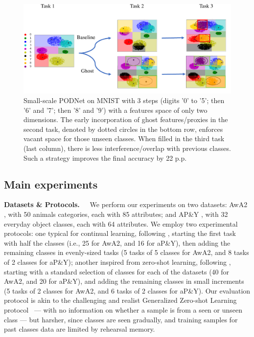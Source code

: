 
\begin{figure}
    \centering
    \includegraphics[width=0.8\linewidth]{images/ghost/toy_model_6_2_2.pdf}
    \caption{Small-scale PODNet on MNIST with 3 steps (digits '0' to '5'; then '6' and '7'; then
        '8' and '9') with a features space of only two dimensions. The early incorporation
        of ghost features/proxies in the second task, denoted by dotted circles in the bottom
        row, enforces vacant space for those unseen classes. When filled in the third task
        (last column), there is less interference/overlap with previous classes. Such a
        strategy improves the final accuracy by 22 p.p.}
    \label{fig:toy_ghost_weights_3steps}
\end{figure}

\subsection{Main experiments}
\label{sec:quantitative}

\textbf{Datasets \& Protocols.~~} We perform our experiments on two datasets: AwA2
\cite{xian2019awa2}, with 50 animals categories, each with 85 attributes; and AP\&Y
\cite{farhadi2009apy}, with 32 everyday object classes, each with 64 attributes. We employ two
experimental protocols: one typical for continual learning, following
\cite{hou2019ucir,douillard2020podnet}, starting the first task with half the classes (i.e., 25 for
AwA2, and 16 for aP\&Y), then adding the remaining classes in evenly-sized tasks (5 tasks of 5
classes for AwA2, and 8 tasks of 2 classes for aP\&Y); another inspired from zero-shot learning,
following \cite{xian2019awa2}, starting with a standard selection of classes for each of the
datasets (40 for AwA2, and 20 for aP\&Y), and adding the remaining classes in small increments (5
tasks of 2 classes for AwA2, and 6 tasks of 2 classes for aP\&Y). Our evaluation protocol is akin to
the challenging and realist Generalized Zero-shot Learning \cite{scheirer2013generalizedzeroshot,
    chao2016generalizedzeroshot} protocol  — with no information on whether a sample is from a seen or
unseen class — but harsher, since classes are seen gradually, and training samples for past classes
data are limited by rehearsal memory.

